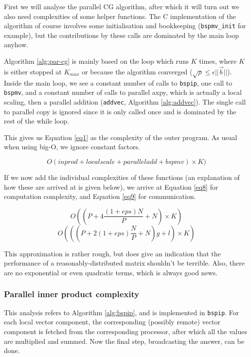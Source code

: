 \documentclass[a4paper]{article}
\newcommand{\ve}[1]{\ensuremath{\vec{#1}}}
\begin{document}
First we will analyse the parallel CG algorithm, after which it will turn out we also need
complexities of some helper functions. The C implementation of the algorithm of course
involves some initialisation and bookkeeping (\texttt{bspmv\_init} for example), but the
contributions by these calls are dominated by the main loop anyhow.

Algorithm \ref{alg:par-cg} is mainly based on the loop which runs $K$ times, where $K$ is
either stopped at $K_{max}$ or because the algorithm converged ($\sqrt \rho \leq \epsilon || \ve b||$).
Inside the main loop, we see a constant number of calls to \texttt{bspip}, one call to \texttt{bspmv}, and a constant
number of calls to parallel axpy, which is actually a local scaling, then a parallel addition (\texttt{addvec}, Algorithm \ref{alg:addvec}).
The single call to parallel copy is ignored since it is only called once and is dominated by the rest of the while loop.

This gives us Equation \ref{eq1} as the complexity of the outer program. As usual when using big-O, we ignore
constant factors.

\begin{equation}
    O(inprod + localscale + paralleladd + bspmv)\times K)
    \label{eq1}
\end{equation}

If we now add the individual complexities of these functions
(an explanation of how these are arrived at is given below), we
arrive at Equation \ref{eq8} for computation complexity, and Equation
\ref{eq9} for communication.

\begin{equation}
    O( (P+4\frac{(1+eps)N}{P} + N) \times K)
    \label{eq8}
\end{equation}
\begin{equation}
    O( ( ( P + 2(1+eps)\frac{N}{P} + N )g + l) \times K)
    \label{eq9}
\end{equation}

This approximation is rather rough, but does give an indication
that the performance of a reasonably-distributed matrix shouldn't
be terrible. Also, there are no exponential or even quadratic terms,
which is always good news.

\subsubsection{Parallel inner product complexity}

This analysis refers to Algorithm \ref{alg:bspip}, and is
implemented in \texttt{bspip}. For each local vector component,
the corresponding (possibly remote) vector component is fetched
from the corresponding processor, after which all the values
are multiplied and summed. Now the final step, broadcasting the answer,
can be done.
\end{document}
